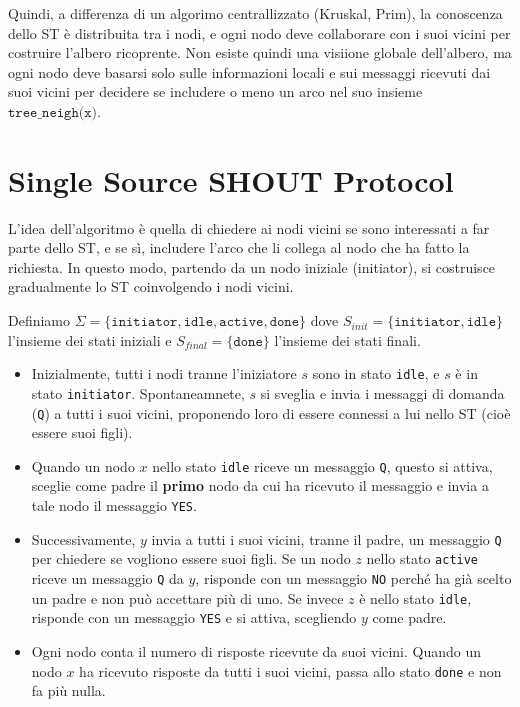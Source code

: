Quindi, a differenza di un algorimo centrallizzato (Kruskal, Prim), la conoscenza dello ST è distribuita tra i nodi, e ogni nodo deve collaborare con i suoi vicini per costruire l'albero ricoprente. Non esiste quindi una visiione globale dell'albero, ma ogni nodo deve basarsi solo sulle informazioni locali e sui messaggi ricevuti dai suoi vicini per decidere se includere o meno un arco nel suo insieme $\texttt{tree\_neigh(x)}$.

\section{Single Source SHOUT Protocol}

L'idea dell'algoritmo è quella di chiedere ai nodi vicini se sono interessati a far parte dello ST, e se sì, includere l'arco che li collega al nodo che ha fatto la richiesta. In questo modo, partendo da un nodo iniziale (initiator), si costruisce gradualmente lo ST coinvolgendo i nodi vicini.

Definiamo $\Sigma = \{\texttt{initiator}, \texttt{idle}, \texttt{active}, \texttt{done}\}$ dove $S_{init} = \{\texttt{initiator}, \texttt{idle}\}$ l'insieme dei stati iniziali e $S_{final} = \{\texttt{done}\}$ l'insieme dei stati finali.

\begin{itemize}
    \item Inizialmente, tutti i nodi tranne l'iniziatore $s$ sono in stato \texttt{idle}, e $s$ è in stato \texttt{initiator}. Spontaneamnete, $s$ si sveglia e invia i messaggi di domanda (\texttt{Q}) a tutti i suoi vicini, proponendo loro di essere connessi a lui nello ST (cioè essere suoi figli).
    \item Quando un nodo $x$ nello stato \texttt{idle} riceve un messaggio \texttt{Q}, questo si attiva, sceglie come padre il \textbf{primo} nodo da cui ha ricevuto il messaggio e invia a tale nodo il messaggio \texttt{YES}.
    \item Successivamente, $y$ invia a tutti i suoi vicini, tranne il padre, un messaggio \texttt{Q} per chiedere se vogliono essere suoi figli. Se un nodo $z$ nello stato \texttt{active} riceve un messaggio \texttt{Q} da $y$, risponde con un messaggio \texttt{NO} perché ha già scelto un padre e non può accettare più di uno. Se invece $z$ è nello stato \texttt{idle}, risponde con un messaggio \texttt{YES} e si attiva, scegliendo $y$ come padre.
    \item Ogni nodo conta il numero di risposte ricevute da suoi vicini. Quando un nodo $x$ ha ricevuto risposte da tutti i suoi vicini, passa allo stato \texttt{done} e non fa più nulla.
\end{itemize}

